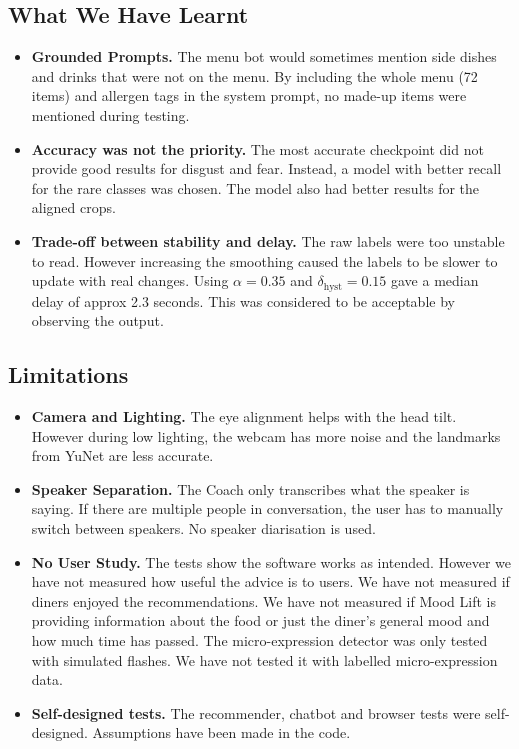 \documentclass[conference]{IEEEtran}
\begin{document}
\subsection{What We Have Learnt}
\begin{itemize}
    \item \textbf{Grounded Prompts.} The menu bot would sometimes mention side dishes and drinks that were not on the menu. By including the whole menu (72 items) and allergen tags in the system prompt, no made-up items were mentioned during testing.
    \item \textbf{Accuracy was not the priority.} The most accurate checkpoint did not provide good results for disgust and fear. Instead, a model with better recall for the rare classes was chosen. The model also had better results for the aligned crops.
    \item \textbf{Trade-off between stability and delay.} The raw labels were too unstable to read. However increasing the smoothing caused the labels to be slower to update with real changes. Using $\alpha = 0.35$ and $\delta_{\text{hyst}} = 0.15$ gave a median delay of approx 2.3 seconds. This was considered to be acceptable by observing the output.
\end{itemize}

\subsection{Limitations}
\label{sec:limits}
\begin{itemize}
    \item \textbf{Camera and Lighting.} The eye alignment helps with the head tilt. However during low lighting, the webcam has more noise and the landmarks from YuNet are less accurate.
    \item \textbf{Speaker Separation.} The Coach only transcribes what the speaker is saying. If there are multiple people in conversation, the user has to manually switch between speakers. No speaker diarisation is used.
    \item \textbf{No User Study.} The tests show the software works as intended. However we have not measured how useful the advice is to users. We have not measured if diners enjoyed the recommendations. We have not measured if Mood Lift is providing information about the food or just the diner's general mood and how much time has passed. The micro-expression detector was only tested with simulated flashes. We have not tested it with labelled micro-expression data.
    \item \textbf{Self-designed tests.} The recommender, chatbot and browser tests were self-designed. Assumptions have been made in the code.
\end{itemize}
\end{document}
